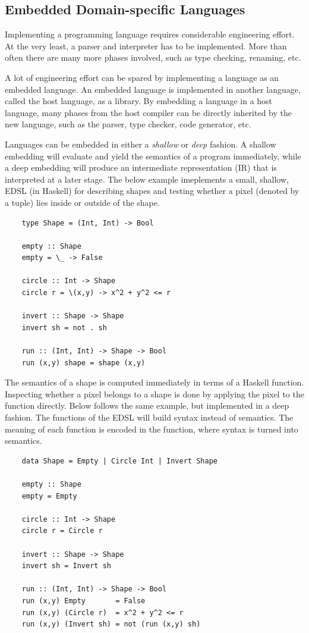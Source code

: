\subsection{Embedded Domain-specific Languages}

Implementing a programming language requires considerable engineering effort. At the very least, a parser and interpreter
has to be implemented. More than often there are many more phases involved, such as type checking, renaming, etc.

A lot of engineering effort can be spared by implementing a language as an embedded language. An embedded language is
implemented in another language, called the host language, as a library. By embedding a language in
a host language, many phases from the host compiler can be directly inherited by the new language, such as the parser,
type checker, code generator, etc.

Languages can be embedded in either a \textit{shallow} or \textit{deep} fashion. A shallow embedding will evaluate and yield
the semantics of a program immediately, while a deep embedding will produce an intermediate representation (IR) that is
interpreted at a later stage. The below example imeplements a small, shallow, EDSL (in Haskell) for describing shapes and testing
whether a pixel (denoted by a  tuple) lies inside or outside of the shape.

\begin{verbatim}
    type Shape = (Int, Int) -> Bool

    empty :: Shape
    empty = \_ -> False

    circle :: Int -> Shape
    circle r = \(x,y) -> x^2 + y^2 <= r

    invert :: Shape -> Shape
    invert sh = not . sh

    run :: (Int, Int) -> Shape -> Bool
    run (x,y) shape = shape (x,y)
\end{verbatim}

The semantics of a shape is computed immediately in terms of a Haskell function. Inspecting whether a pixel belongs to a
shape is done by applying the pixel to the function directly. Below follows the same example, but implemented in a deep
fashion. The functions of the EDSL will build syntax instead of semantics.
The meaning of each function is encoded in the  function, where syntax is turned into semantics.

\begin{verbatim}
    data Shape = Empty | Circle Int | Invert Shape

    empty :: Shape
    empty = Empty

    circle :: Int -> Shape
    circle r = Circle r

    invert :: Shape -> Shape
    invert sh = Invert sh

    run :: (Int, Int) -> Shape -> Bool
    run (x,y) Empty       = False
    run (x,y) (Circle r)  = x^2 + y^2 <= r
    run (x,y) (Invert sh) = not (run (x,y) sh)
\end{verbatim}

